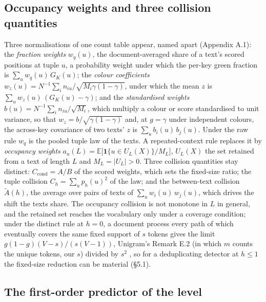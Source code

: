 \documentclass[11pt,letterpaper]{article}
\begin{document}
\hypertarget{occupancy-weights-and-three-collision-quantities}{%
\subsection{Occupancy weights and three collision quantities}\label{occupancy-weights-and-three-collision-quantities}}

Three normalisations of one count table appear, named apart (Appendix A.1): the \emph{fraction weights} \(w_q(u)\), the document-averaged share of a text's scored positions at tuple \(u\), a probability weight under which the per-key green fraction is \(\sum_u w_q(u)\,G_K(u)\); the \emph{colour coefficients} \(w_z(u) = N^{-1}\sum_i n_{iu}/\sqrt{M_i\gamma(1-\gamma)}\), under which the mean \(z\) is \(\sum_u w_z(u)\,(G_K(u) - \gamma)\); and the \emph{standardised weights} \(b(u) = N^{-1}\sum_i n_{iu}/\sqrt{M_i}\), which multiply a colour or score standardised to unit variance, so that \(w_z = b/\sqrt{\gamma(1-\gamma)}\) and, at \(g = \gamma\) under independent colours, the across-key covariance of two texts' \(z\) is \(\sum_u b_i(u)\,b_j(u)\). Under the raw rule \(w_q\) is the pooled tuple law of the texts. A repeated-context rule replaces it by \emph{occupancy weights} \(a_u(L) = \mathbb{E}\bigl[\mathbf 1\{u \in U_L(X)\}/M_L\bigr]\), \(U_L(X)\) the set retained from a text of length \(L\) and \(M_L = |U_L| > 0\). Three collision quantities stay distinct: \(C_{\mathrm{cond}} = A/B\) of the scored weights, which sets the fixed-size ratio; the tuple collision \(C_h = \sum_u p_h(u)^2\) of the law; and the between-text collision \(\tilde A(h)\), the average over pairs of texts of \(\sum_u w_i(u)\,w_j(u)\), which drives the shift the texts share. The occupancy collision is not monotone in \(L\) in general, and the retained set reaches the vocabulary only under a coverage condition; under the distinct rule at \(h = 0\), a document process every path of which eventually covers the same fixed support of \(s\) tokens gives the limit \(g(1-g)(V-s)/(s(V-1))\), Unigram's Remark E.2 (in which \(m\) counts the unique tokens, our \(s\)) divided by \(s^2\) \citep[p.~34]{zhao2024unigram}, so for a deduplicating detector at \(h \le 1\) the fixed-size reduction can be material (\S{}5.1).

\hypertarget{the-first-order-predictor-of-the-level}{%
\subsection{The first-order predictor of the level}\label{the-first-order-predictor-of-the-level}}
\end{document}
